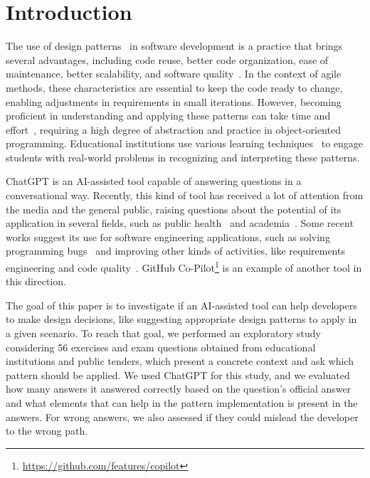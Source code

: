 \documentclass[runningheads]{llncs}
\begin{document}
\section{Introduction}\label{sec1}

The use of design patterns~\cite{bib1,bib3,bib6} in software development is a practice that brings several advantages, including code reuse, better code organization, ease of maintenance, better scalability, and software quality~\cite{bib4,bib8}. In the context of agile methods, these characteristics are essential to keep the code ready to change, enabling adjustments in requirements in small iterations. However, becoming proficient in understanding and applying these patterns can take time and effort~\cite{bib2}, requiring a high degree of abstraction and practice in object-oriented programming. Educational institutions use various learning techniques~\cite{bib5,bib7} to engage students with real-world problems in recognizing and interpreting these patterns.

ChatGPT is an AI-assisted tool capable of answering questions in a conversational way. Recently, this kind of tool has received a lot of attention from the media and the general public, raising questions about the potential of its application in several fields, such as public health~\cite{biswas2023role} and academia~\cite{lund2023chatting}. Some recent works suggest its use for software engineering applications, such as solving programming bugs~\cite{surameery2023use} and improving other kinds of activities, like requirements engineering and code quality~\cite{white2023chatgpt}. GitHub Co-Pilot\footnote{\url{https://github.com/features/copilot}} is an example of another tool in this direction.

The goal of this paper is to investigate if an AI-assisted tool can help developers to make design decisions, like suggesting appropriate design patterns to apply in a given scenario. To reach that goal, we performed an exploratory study considering 56 exercises and exam questions obtained from educational institutions and public tenders, which present a concrete context and ask which pattern should be applied. We used ChatGPT for this study, and we evaluated how many answers it answered correctly based on the question's official answer and what elements that can help in the pattern implementation is present in the answers. For wrong answers, we also assessed if they could mislead the developer to the wrong path.
\end{document}

